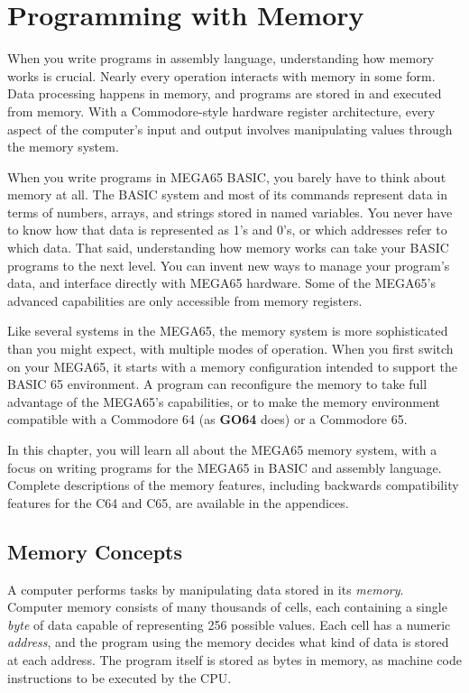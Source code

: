 
\chapter{Programming with Memory}
\label{cha:programming-with-memory}

When you write programs in assembly language, understanding how memory works is
crucial. Nearly every operation interacts with memory in some form. Data
processing happens in memory, and programs are stored in and executed from memory.
With a Commodore-style hardware register architecture, every aspect of the
computer's input and output involves manipulating values through the memory system.

When you write programs in MEGA65 BASIC, you barely have to think about memory
at all. The BASIC system and most of its commands represent data in terms of
numbers, arrays, and strings stored in named variables. You never have to know
how that data is represented as 1's and 0's, or which addresses refer to which
data. That said, understanding how memory works can take your BASIC programs
to the next level. You can invent new ways to manage your program's data, and
interface directly with MEGA65 hardware. Some of the MEGA65's advanced
capabilities are only accessible from memory registers.

Like several systems in the MEGA65, the memory system is more sophisticated than you
might expect, with multiple modes of operation. When you first switch on your
MEGA65, it starts with a memory configuration intended to support the
BASIC 65 environment. A program can reconfigure the memory to take full
advantage of the MEGA65's capabilities, or to make the memory environment
compatible with a Commodore 64 (as \textbf{GO64} does) or a Commodore 65.

In this chapter, you will learn all about the MEGA65 memory system, with a
focus on writing programs for the MEGA65 in BASIC and assembly language.
Complete descriptions of the memory features, including backwards
compatibility features for the C64 and C65, are available in the appendices.

\newpage
\section{Memory Concepts}
\label{sec:programming-with-memory-concepts}

A computer performs tasks by manipulating data stored in its {\em memory}.
Computer memory consists of many thousands of cells, each containing a single
{\em byte} of data capable of representing 256 possible values. Each cell has a numeric
{\em address}, and the program using the memory decides what kind of data is stored
at each address. The program itself is stored as bytes in memory, as
machine code instructions to be executed by the CPU.

